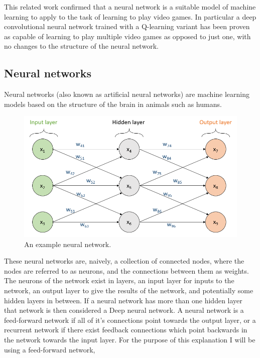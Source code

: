 \documentclass[10pt]{article}
\begin{document}
		This related work confirmed that a neural network is a suitable model of machine learning to apply to the task of learning to play video games. In particular a deep convolutional neural network trained with a Q-learning variant has been proven as capable of learning to play multiple video games as opposed to just one, with no changes to the structure of the neural network.\\
		
	\bigskip
	\subsection{Neural networks}
		Neural networks (also known as artificial neural networks) are machine learning models based on the structure of the brain in animals such as humans.\\
		
		\begin{figure}[h]			
			\includegraphics[scale=0.5]{img/network}
			\centering
			\caption{An example neural network.}
			\label{nnetwork}
		\end{figure}	
		
		These neural networks are, naively, a collection of connected nodes, where the nodes are referred to as neurons, and the connections between them as weights. The neurons of the network exist in layers, an input layer for inputs to the network, an output layer to give the results of the network, and potentially some hidden layers in between. If a neural network has more than one hidden layer that network is then considered a Deep neural network. A neural network is a feed-forward network if all of it's connections point towards the output layer, or a recurrent network if there exist feedback connections which point backwards in the network towards the input layer. For the purpose of this explanation I will be using a feed-forward network,\\
		
\end{document}
